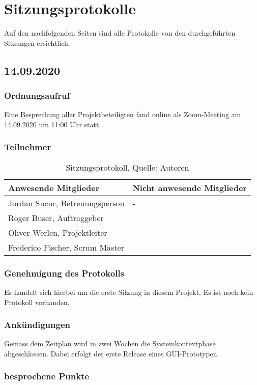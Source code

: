 \section{Sitzungsprotokolle}
Auf den nachfolgenden Seiten sind alle Protokolle von den durchgeführten Sitzungen ersichtlich.

\subsection{14.09.2020}
\subsubsection{Ordnungsaufruf}
Eine Besprechung aller Projektbeteiligten fand online als Zoom-Meeting am 14.09.2020 um 11:00 Uhr statt.
\subsubsection{Teilnehmer}
\begin{table}[H]
	\setlength\extrarowheight{2pt} %
	\begin{tabularx}{\textwidth}{|X|X|}
		\hline
		\textbf{Anwesende Mitglieder} &  \textbf{Nicht anwesende Mitglieder} \\
		\hline
		Jordan Sucur, Betreuungsperson &  -\\
		Roger Buser, Auftraggeber &  \\
		Oliver Werlen, Projektleiter &  \\
		Frederico Fischer, Scrum Master &  \\
		\hline
	\end{tabularx}
	\caption{ \label{tbl: Teilnehmerliste vom 14.09.2020}Sitzungsprotokoll, Quelle: Autoren}
\end{table}
\subsubsection{Genehmigung des Protokolls}
Es handelt sich hierbei um die erste Sitzung in diesem Projekt. Es ist noch kein Protokoll vorhanden. 
\subsubsection{Ankündigungen}
Gemäss dem Zeitplan wird in zwei Wochen die Systemkontextphase abgeschlossen. Dabei erfolgt der erste Release eines GUI-Prototypen.
\subsubsection{besprochene Punkte}
